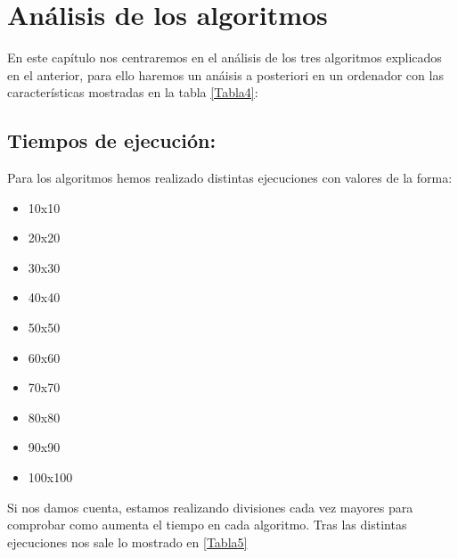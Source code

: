 \chapter[Análisis de los algoritmos]{\label{identificadorReferenciaCruzada}
Análisis de los algoritmos}

En este capítulo nos centraremos en el análisis de los tres algoritmos explicados en el anterior, para ello haremos un anáisis a posteriori en un ordenador con las características mostradas en la tabla \ref{Tabla4}:

\begin{table}[h!]
\begin{center}
\end{center}
\caption{Características del ordenador} \label{Tabla4}
\end{table}

\section{Tiempos de ejecución:}

Para los algoritmos hemos realizado distintas ejecuciones con valores de la forma:

\begin{itemize}
	\item 10x10
	\item 20x20
	\item 30x30
	\item 40x40
	\item 50x50
	\item 60x60
	\item 70x70
	\item 80x80
	\item 90x90
	\item 100x100
\end{itemize}

Si nos damos cuenta, estamos realizando divisiones cada vez mayores para comprobar como aumenta el tiempo en cada algoritmo. Tras las distintas ejecuciones nos sale lo mostrado en \ref{Tabla5}

